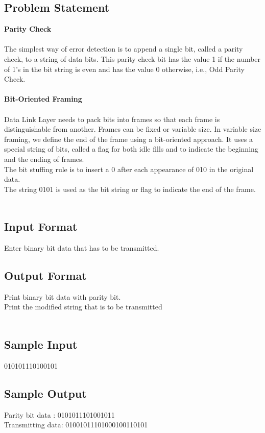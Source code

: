 \documentclass{article}
\begin{document}
    \subsection{Problem Statement}
    \textbf{Parity Check}
    \\ \\The simplest way of error detection is to append a single bit, called a parity check, to a string of data bits. This parity check bit has the value 1 if the number of 1’s in the bit string is even and has the value 0 otherwise, i.e., Odd Parity Check.\\ \\
    \textbf{Bit-Oriented Framing}
    \\ \\Data Link Layer needs to pack bits into frames so that each frame is distinguishable from another. Frames can be fixed or variable size. In variable size framing, we define the end of the frame using a bit-oriented approach. It uses a special string of bits, called a flag for both idle fills and to indicate the beginning and the ending of frames.\\ 
    The bit stuffing rule is to insert a 0 after each appearance of 010 in the original data. \\
    The string 0101 is used as the bit string or flag to indicate the end of the frame.\\ \\

    \subsection{Input Format}
    Enter binary bit data that has to be transmitted.\\

    \subsection{Output Format}
    Print binary bit data with parity bit.\\
    Print the modified string that is to be transmitted\\   \\

    \subsection{Sample Input}
    010101110100101

    \subsection{Sample Output}
    Parity bit data : 0101011101001011\\
    Transmitting data: 01001011101000100110101
\end{document}
